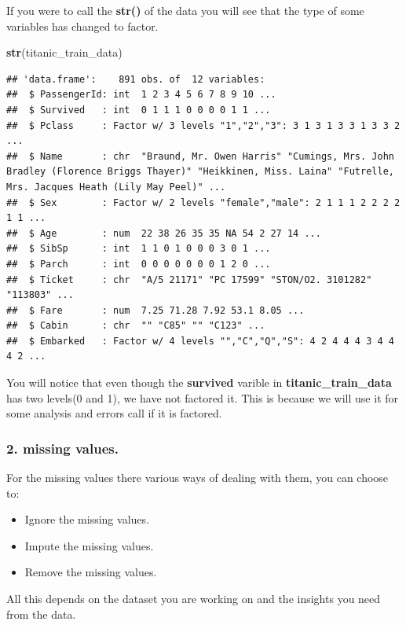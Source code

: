 \documentclass[
]{article}
\newenvironment{Shaded}{\begin{snugshade}}{\end{snugshade}}
\newcommand{\FunctionTok}[1]{\textcolor[rgb]{0.13,0.29,0.53}{\textbf{#1}}}
\newcommand{\NormalTok}[1]{#1}
\providecommand{\tightlist}{%
  \setlength{\itemsep}{0pt}\setlength{\parskip}{0pt}}
\begin{document}
If you were to call the \textbf{str()} of the data you will see that the
type of some variables has changed to factor.

\begin{Shaded}
\begin{Highlighting}[]
\FunctionTok{str}\NormalTok{(titanic\_train\_data)}
\end{Highlighting}
\end{Shaded}

\begin{verbatim}
## 'data.frame':    891 obs. of  12 variables:
##  $ PassengerId: int  1 2 3 4 5 6 7 8 9 10 ...
##  $ Survived   : int  0 1 1 1 0 0 0 0 1 1 ...
##  $ Pclass     : Factor w/ 3 levels "1","2","3": 3 1 3 1 3 3 1 3 3 2 ...
##  $ Name       : chr  "Braund, Mr. Owen Harris" "Cumings, Mrs. John Bradley (Florence Briggs Thayer)" "Heikkinen, Miss. Laina" "Futrelle, Mrs. Jacques Heath (Lily May Peel)" ...
##  $ Sex        : Factor w/ 2 levels "female","male": 2 1 1 1 2 2 2 2 1 1 ...
##  $ Age        : num  22 38 26 35 35 NA 54 2 27 14 ...
##  $ SibSp      : int  1 1 0 1 0 0 0 3 0 1 ...
##  $ Parch      : int  0 0 0 0 0 0 0 1 2 0 ...
##  $ Ticket     : chr  "A/5 21171" "PC 17599" "STON/O2. 3101282" "113803" ...
##  $ Fare       : num  7.25 71.28 7.92 53.1 8.05 ...
##  $ Cabin      : chr  "" "C85" "" "C123" ...
##  $ Embarked   : Factor w/ 4 levels "","C","Q","S": 4 2 4 4 4 3 4 4 4 2 ...
\end{verbatim}

You will notice that even though the \textbf{survived} varible in
\textbf{titanic\_train\_data} has two levels(0 and 1), we have not
factored it. This is because we will use it for some analysis and errors
call if it is factored.

\hypertarget{missing-values.}{%
\subsubsection{2. missing values.}\label{missing-values.}}

For the missing values there various ways of dealing with them, you can
choose to:

\begin{itemize}
\tightlist
\item
  Ignore the missing values.
\item
  Impute the missing values.
\item
  Remove the missing values.
\end{itemize}

All this depends on the dataset you are working on and the insights you
need from the data.
\end{document}
